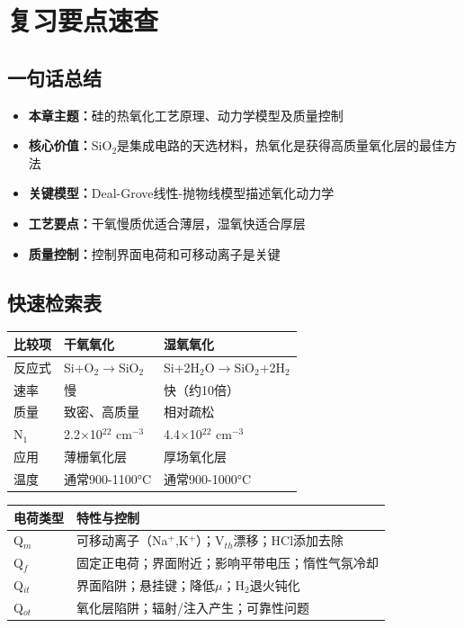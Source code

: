 \documentclass[UTF8,12pt,a4paper]{ctexart}
\begin{document}
\section{复习要点速查}

\subsection{一句话总结}

\begin{itemize}
    \item \textbf{本章主题：}硅的热氧化工艺原理、动力学模型及质量控制
    \item \textbf{核心价值：}SiO$_2$是集成电路的天选材料，热氧化是获得高质量氧化层的最佳方法
    \item \textbf{关键模型：}Deal-Grove线性-抛物线模型描述氧化动力学
    \item \textbf{工艺要点：}干氧慢质优适合薄层，湿氧快适合厚层
    \item \textbf{质量控制：}控制界面电荷和可移动离子是关键
\end{itemize}

\subsection{快速检索表}

\begin{tabular}{|p{3cm}|p{5.5cm}|p{5.5cm}|}
\hline
\textbf{比较项} & \textbf{干氧氧化} & \textbf{湿氧氧化} \\
\hline
反应式 & Si+O$_2$$\rightarrow$SiO$_2$ & Si+2H$_2$O$\rightarrow$SiO$_2$+2H$_2$ \\
\hline
速率 & 慢 & 快（约10倍） \\
\hline
质量 & 致密、高质量 & 相对疏松 \\
\hline
N$_1$ & 2.2$\times$10$^{22}$ cm$^{-3}$ & 4.4$\times$10$^{22}$ cm$^{-3}$ \\
\hline
应用 & 薄栅氧化层 & 厚场氧化层 \\
\hline
温度 & 通常900-1100°C & 通常900-1000°C \\
\hline
\end{tabular}

\vspace{1em}

\begin{tabular}{|p{3cm}|p{11cm}|}
\hline
\textbf{电荷类型} & \textbf{特性与控制} \\
\hline
Q$_m$ & 可移动离子（Na$^+$,K$^+$）；V$_{th}$漂移；HCl添加去除 \\
\hline
Q$_f$ & 固定正电荷；界面附近；影响平带电压；惰性气氛冷却 \\
\hline
Q$_{it}$ & 界面陷阱；悬挂键；降低$\mu$；H$_2$退火钝化 \\
\hline
Q$_{ot}$ & 氧化层陷阱；辐射/注入产生；可靠性问题 \\
\hline
\end{tabular}
\end{document}

